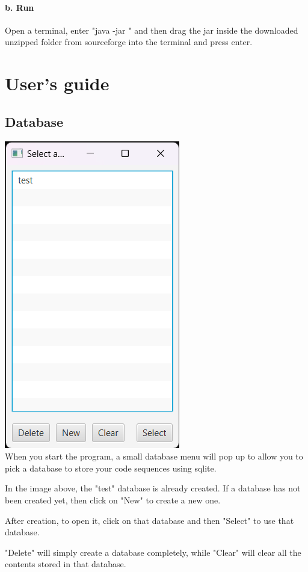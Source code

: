 \documentclass[11pt]{report}
\begin{document}
\subsubsection*{b. Run}
  Open a terminal, enter "java -jar " and then drag the jar inside the downloaded unzipped folder from sourceforge into the terminal and press enter.
\chapter{User's guide}
\section{Database}
\includegraphics{database} \\
When you start the program, a small database menu will pop up to allow you to pick a database to store your code sequences 
using sqlite. 

In the image above, the "test" database is already created. If a database has not been created yet, 
then click on "New" to create a new one. 

After creation, to open it, click on that database and then "Select" to use that database.

"Delete" will simply create a database completely, while "Clear" will clear all the contents stored in that database.
\end{document}
